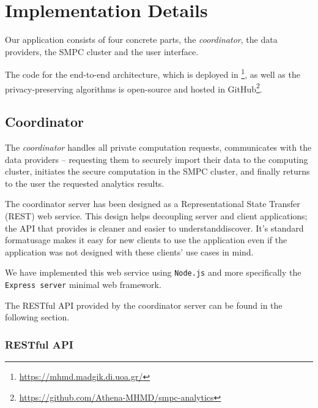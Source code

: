 \chapter{Implementation Details}\label{c:implementation}

Our application consists of four concrete parts, the \textit{coordinator}, the data providers, the SMPC cluster and the user interface.


The code for the end\hyp to\hyp end architecture, which is deployed in \footnote{\href{https://mhmd.madgik.di.uoa.gr/}{https://mhmd.madgik.di.uoa.gr/}}, as well as the privacy\hyp preserving algorithms is open\hyp source and hosted in GitHub\footnote{\href{https://github.com/Athena-MHMD/smpc-analytics}{https://github.com/Athena-MHMD/smpc-analytics}}.



\section{Coordinator}\label{s:impl-coordinator}
The \textit{coordinator} handles all private computation requests, communicates with the data providers -- requesting them to securely import their data to the computing cluster, initiates the secure computation in the SMPC cluster, and finally returns to the user the requested analytics results.

The coordinator server has been designed as a Representational State Transfer (REST) web service.
This design helps decoupling server and client applications; the API that provides is cleaner and easier to understand\myslash discover.
It's standard format\myslash usage makes it easy for new clients to use the application even if the application was not designed with these clients' use cases in mind.

We have implemented this web service using \texttt{Node.js} and more specifically the \texttt{Express server} minimal web framework.

The RESTful API provided by the coordinator server can be found in the following section.


\subsection{RESTful API}\label{ss:coord-restful-api}

